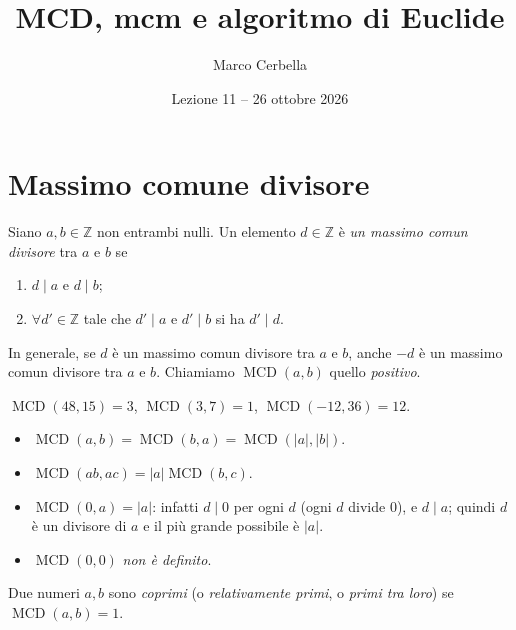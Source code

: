 \documentclass[11pt,a4paper]{article}
\title{MCD, mcm e algoritmo di Euclide}
\author{Marco Cerbella}
\date{Lezione 11 -- 26 ottobre 2026}
\begin{document}
\maketitle

\section{Massimo comune divisore}

\begin{definizione}
Siano $a, b \in \mathbb{Z}$ non entrambi nulli. Un elemento $d \in \mathbb{Z}$ è \emph{un massimo comun divisore} tra $a$ e $b$ se
\begin{enumerate}
  \item[i)] $d \mid a$ e $d \mid b$;
  \item[ii)] $\forall d' \in \mathbb{Z}$ tale che $d' \mid a$ e $d' \mid b$ si ha $d' \mid d$.
\end{enumerate}
\end{definizione}

\begin{osservazione}
In generale, se $d$ è un massimo comun divisore tra $a$ e $b$, anche $-d$ è un massimo comun divisore tra $a$ e $b$. Chiamiamo $\operatorname{MCD}(a, b)$ quello \emph{positivo}.
\end{osservazione}

\begin{esempio}
$\operatorname{MCD}(48, 15) = 3$, \quad $\operatorname{MCD}(3, 7) = 1$, \quad $\operatorname{MCD}(-12, 36) = 12$.
\end{esempio}

\begin{proprieta}
\begin{itemize}
  \item $\operatorname{MCD}(a, b) = \operatorname{MCD}(b, a) = \operatorname{MCD}(|a|, |b|)$.
  \item $\operatorname{MCD}(ab, ac) = |a|\operatorname{MCD}(b, c)$.
  \item $\operatorname{MCD}(0, a) = |a|$: infatti $d \mid 0$ per ogni $d$ (ogni $d$ divide $0$), e $d \mid a$; quindi $d$ è un divisore di $a$ e il più grande possibile è $|a|$.
  \item $\operatorname{MCD}(0, 0)$ \emph{non è definito}.
\end{itemize}
\end{proprieta}

\begin{definizione}
Due numeri $a, b$ sono \emph{coprimi} (o \emph{relativamente primi}, o \emph{primi tra loro}) se $\operatorname{MCD}(a, b) = 1$.
\end{definizione}
\end{document}
